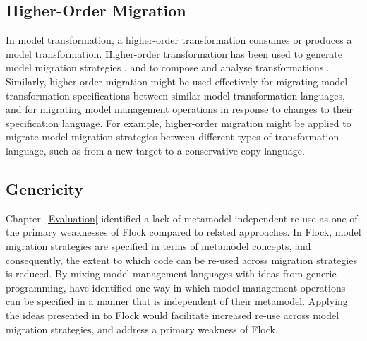 \subsection{Higher-Order Migration}
In model transformation, a higher-order transformation consumes or produces a model transformation. Higher-order transformation has been used to generate model migration strategies \cite{cicchetti08thesis,garces09managing}, and to compose and analyse transformations \cite{tisi09hot}. Similarly, higher-order migration might be used effectively for migrating model transformation specifications between similar model transformation languages, and for migrating model management operations in response to changes to their specification language. For example, higher-order migration might be applied to migrate model migration strategies between different types of transformation language, such as from a new-target to a conservative copy language.


\subsection{Genericity}
Chapter~\ref{Evaluation} identified a lack of metamodel-independent re-use as one of the primary weaknesses of Flock compared to related approaches. In Flock, model migration strategies are specified in terms of metamodel concepts, and consequently, the extent to which code can be re-used across migration strategies is reduced. By mixing model management languages with ideas from generic programming, \cite{delara10generic} have identified one way in which model management operations can be specified in a manner that is independent of their metamodel. Applying the ideas presented in \cite{delara10generic} to Flock would facilitate increased re-use across model migration strategies, and address a primary weakness of Flock. 
